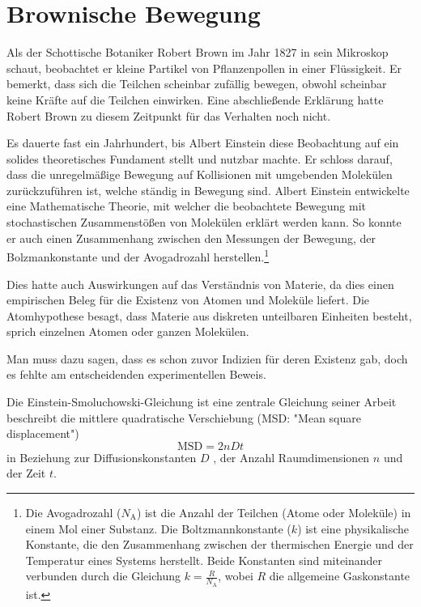 %
%
%
%
\section{Brownische Bewegung\label{brown:BrownBewegung}}

Als der Schottische Botaniker Robert Brown im Jahr 1827 in sein Mikroskop schaut, beobachtet er kleine Partikel von Pflanzenpollen in einer Flüssigkeit. Er bemerkt, dass sich die Teilchen scheinbar zufällig bewegen, obwohl scheinbar keine Kräfte auf die Teilchen einwirken. Eine abschließende Erklärung hatte Robert Brown zu diesem Zeitpunkt für das Verhalten noch nicht.


Es dauerte fast ein Jahrhundert, bis Albert Einstein diese Beobachtung auf ein solides theoretisches Fundament stellt und nutzbar machte. Er schloss darauf, dass die unregelmäßige Bewegung auf Kollisionen mit umgebenden Molekülen zurückzuführen ist, welche ständig in Bewegung sind. Albert Einstein entwickelte eine Mathematische Theorie, mit welcher die beobachtete Bewegung mit stochastischen Zusammenstößen von Molekülen erklärt werden kann. So konnte er auch einen Zusammenhang zwischen den Messungen der Bewegung, der Bolzmankonstante und der  Avogadrozahl herstellen.\footnote{Die Avogadrozahl ($N_\mathrm{A}$) ist die Anzahl der Teilchen (Atome oder Moleküle) in einem Mol einer Substanz. Die Boltzmannkonstante ($k$) ist eine physikalische Konstante, die den Zusammenhang zwischen der thermischen Energie und der Temperatur eines Systems herstellt. Beide Konstanten sind miteinander verbunden durch die Gleichung $k = \frac{R}{N_\mathrm{A}}$, wobei $R$ die allgemeine Gaskonstante ist.}

Dies hatte auch Auswirkungen auf das Verständnis von Materie, da dies einen empirischen Beleg für die Existenz von Atomen und Moleküle liefert. Die Atomhypothese besagt, dass Materie aus diskreten unteilbaren Einheiten besteht, sprich einzelnen Atomen oder ganzen Molekülen. 

Man muss dazu sagen, dass es schon zuvor Indizien für deren Existenz gab, doch es fehlte am entscheidenden experimentellen Beweis.

Die Einstein-Smoluchowski-Gleichung ist eine zentrale Gleichung seiner Arbeit beschreibt die mittlere quadratische Verschiebung (MSD: "Mean square displacement")
\begin{equation}
	\mathrm{MSD} = 2nDt
\end{equation}
in Beziehung zur Diffusionskonstanten $ D $ , der Anzahl Raumdimensionen $ n $ und der Zeit $ t $.


